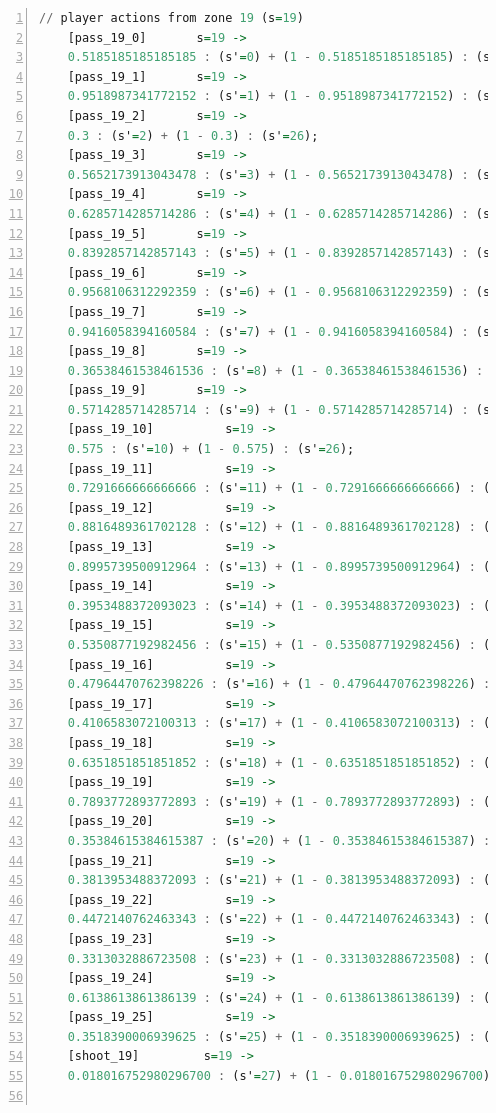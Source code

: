 \documentclass{l4proj}
\begin{document}
\begin{appendices}
\begin{lstlisting}[language=Haskell, numbers=left, caption=MDP used for strategy generation. This is the model specification as-is after the refinements at the end of chapter 3.]
	// player actions from zone 19 (s=19)
	[pass_19_0]	      s=19 ->
	0.5185185185185185 : (s'=0) + (1 - 0.5185185185185185) : (s'=26);
	[pass_19_1]	      s=19 ->
	0.9518987341772152 : (s'=1) + (1 - 0.9518987341772152) : (s'=26);
	[pass_19_2]	      s=19 ->
	0.3 : (s'=2) + (1 - 0.3) : (s'=26);
	[pass_19_3]	      s=19 ->
	0.5652173913043478 : (s'=3) + (1 - 0.5652173913043478) : (s'=26);
	[pass_19_4]	      s=19 ->
	0.6285714285714286 : (s'=4) + (1 - 0.6285714285714286) : (s'=26);
	[pass_19_5]	      s=19 ->
	0.8392857142857143 : (s'=5) + (1 - 0.8392857142857143) : (s'=26);
	[pass_19_6]	      s=19 ->
	0.9568106312292359 : (s'=6) + (1 - 0.9568106312292359) : (s'=26);
	[pass_19_7]	      s=19 ->
	0.9416058394160584 : (s'=7) + (1 - 0.9416058394160584) : (s'=26);
	[pass_19_8]	      s=19 ->
	0.36538461538461536 : (s'=8) + (1 - 0.36538461538461536) : (s'=26);
	[pass_19_9]	      s=19 ->
	0.5714285714285714 : (s'=9) + (1 - 0.5714285714285714) : (s'=26);
	[pass_19_10]	      s=19 ->
	0.575 : (s'=10) + (1 - 0.575) : (s'=26);
	[pass_19_11]	      s=19 ->
	0.7291666666666666 : (s'=11) + (1 - 0.7291666666666666) : (s'=26);
	[pass_19_12]	      s=19 ->
	0.8816489361702128 : (s'=12) + (1 - 0.8816489361702128) : (s'=26);
	[pass_19_13]	      s=19 ->
	0.8995739500912964 : (s'=13) + (1 - 0.8995739500912964) : (s'=26);
	[pass_19_14]	      s=19 ->
	0.3953488372093023 : (s'=14) + (1 - 0.3953488372093023) : (s'=26);
	[pass_19_15]	      s=19 ->
	0.5350877192982456 : (s'=15) + (1 - 0.5350877192982456) : (s'=26);
	[pass_19_16]	      s=19 ->
	0.47964470762398226 : (s'=16) + (1 - 0.47964470762398226) : (s'=26);
	[pass_19_17]	      s=19 ->
	0.4106583072100313 : (s'=17) + (1 - 0.4106583072100313) : (s'=26);
	[pass_19_18]	      s=19 ->
	0.6351851851851852 : (s'=18) + (1 - 0.6351851851851852) : (s'=26);
	[pass_19_19]	      s=19 ->
	0.7893772893772893 : (s'=19) + (1 - 0.7893772893772893) : (s'=26);
	[pass_19_20]	      s=19 ->
	0.35384615384615387 : (s'=20) + (1 - 0.35384615384615387) : (s'=26);
	[pass_19_21]	      s=19 ->
	0.3813953488372093 : (s'=21) + (1 - 0.3813953488372093) : (s'=26);
	[pass_19_22]	      s=19 ->
	0.4472140762463343 : (s'=22) + (1 - 0.4472140762463343) : (s'=26);
	[pass_19_23]	      s=19 ->
	0.3313032886723508 : (s'=23) + (1 - 0.3313032886723508) : (s'=26);
	[pass_19_24]	      s=19 ->
	0.6138613861386139 : (s'=24) + (1 - 0.6138613861386139) : (s'=26);
	[pass_19_25]	      s=19 ->
	0.3518390006939625 : (s'=25) + (1 - 0.3518390006939625) : (s'=26);
	[shoot_19]	       s=19 ->
	0.018016752980296700 : (s'=27) + (1 - 0.018016752980296700) : (s'=26);


\end{lstlisting}
\end{appendices}
\end{document}
